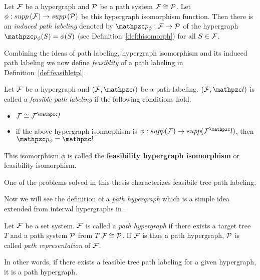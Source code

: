 \begin{definition}
  \label{def:inducedpl}
  Let ${\cal F}$ be a hypergraph and ${\cal P}$ be a path system \stt ${\cal F} \cong
  {\cal P}$. Let  $\phi: supp\left({\cal F}\right) \rightarrow supp\left({\cal P}\right)$ be this hypergraph
  isomorphism function. %
  Then there is an {\em induced path labeling} %
  denoted by $\cp_\phi: \cF \rightarrow \cP$
  of the hypergraph \stt %
  $\cp_\phi(S) = \phi(S)$
  (see Definition~\ref{def:hisomorph}) for all $S \in {\cal F}$.  
\end{definition}

Combining the ideas of path labeling, hypergraph isomorphism and its
induced path labeling we now define {\em feasiblity} of a path
labeling in Definition~\ref{def:feasibletpl}.

\begin{definition}
  \label{def:feasibletpl}
  Let ${\cal F}$ be a hypergraph and $(\cF, \cl)$ be a path
  labeling. $(\cF, \cl)$ is called a {\em feasible path labeling} if
  the following conditions hold.
  \begin{itemize}
  \item $\cF \cong \cF^\cl$
  \item if the above hypergraph isomorphism is $\phi: supp(\cF)
    \rightarrow supp(\cF^\cl)$, then $\cp_\phi = \cl$
  \end{itemize}


  This isomorphism $\phi$ is called the \textbf{feasibility hypergraph
  isomorphism} or feasibility isomorphism.
\end{definition}

One of the problems solved in this thesis \FTPL characterizes
feasibile tree path labeling.

Now we will see the definition of a {\em path hypergraph} which is a
simple idea extended from interval hypergraphs in \cite{kklv10}. 

\begin{definition}
  \label{def:pathhypergraph}
  Let ${\cal F}$ be a set system. ${\cal F}$ is called a {\em path hypergraph}
  if there exists a target tree $T$ and a path system ${\cal P}$ from $T$
  \stt ${\cal F} \cong {\cal P}$. If ${\cal F}$ is thus a path hypergraph, ${\cal P}$ is
  called {\em path representation} of ${\cal F}$.
\end{definition}

In other words, if there exists a feasible tree path labeling for a
given hypergraph, it is a path hypergraph.



